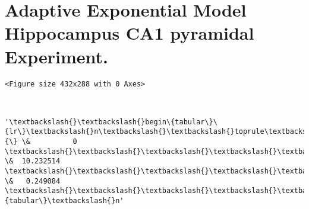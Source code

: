     \hypertarget{adaptive-exponential-model-hippocampus-ca1-pyramidal-experiment.}{%
\section{Adaptive Exponential Model Hippocampus CA1 pyramidal
Experiment.}\label{adaptive-exponential-model-hippocampus-ca1-pyramidal-experiment.}}

    
    \begin{verbatim}
<Figure size 432x288 with 0 Axes>
    \end{verbatim}

    
    \begin{center}
    \end{center}
    { \hspace*{\fill} \\}
    
            \begin{tcolorbox}[breakable, size=fbox, boxrule=.5pt, pad at break*=1mm, opacityfill=0]
\begin{Verbatim}[commandchars=\\\{\}]
'\textbackslash{}\textbackslash{}begin\{tabular\}\{lr\}\textbackslash{}n\textbackslash{}\textbackslash{}toprule\textbackslash{}n\{\} \&          0 \textbackslash{}\textbackslash{}\textbackslash{}\textbackslash{}\textbackslash{}n\textbackslash{}\textbackslash{}midrule\textbackslash{}nchi\textbackslash{}\textbackslash{}\_square
\&  10.232514 \textbackslash{}\textbackslash{}\textbackslash{}\textbackslash{}\textbackslash{}np\textbackslash{}\textbackslash{}\_value    \&   0.249084
\textbackslash{}\textbackslash{}\textbackslash{}\textbackslash{}\textbackslash{}n\textbackslash{}\textbackslash{}bottomrule\textbackslash{}n\textbackslash{}\textbackslash{}end\{tabular\}\textbackslash{}n'
\end{Verbatim}
\end{tcolorbox}
        
